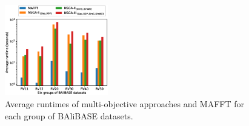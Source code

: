 \begin{figure}[!htbp] 
	\centering
	\includegraphics[width=0.4\textwidth]{Figure/balibase_runtime_comparison}
	\caption{Average runtimes of multi-objective approaches and MAFFT for each group of BAliBASE datasets.} 
	\label{fig:runtime_comp}
\end{figure}
